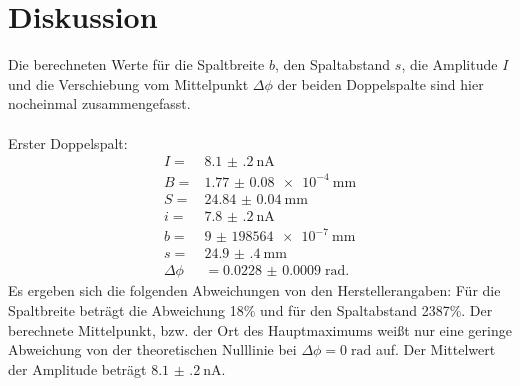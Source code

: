 \section{Diskussion}
\label{sec:Diskussion}
Die berechneten Werte für die Spaltbreite $b$, den Spaltabstand $s$, die Amplitude $I$
und die
Verschiebung vom Mittelpunkt $\Delta \phi$ der beiden
Doppelspalte sind hier nocheinmal zusammengefasst.\\
\\
Erster Doppelspalt:
\begin{align*}
  I =& \SI{8.1(2)}{\nA}\\
  B =& \SI{1.77(8)e-4}{\mm}\\
  S =& \SI{24.84(4)}{\mm}\\
  i =& \SI{7.8(2)}{\nA}\\
  b =& \SI{9(198564)e-7}{\mm}\\
  s =& \SI{24.9(4)}{\mm}\\
  \Delta \phi &=\SI{0.0228(9)}\; \text{rad}.
\end{align*}
Es ergeben sich die folgenden Abweichungen von den Herstellerangaben: Für die
Spaltbreite beträgt die Abweichung 18\% und für den Spaltabstand 2387\%.
Der berechnete Mittelpunkt, bzw. der Ort des Hauptmaximums weißt nur eine
geringe Abweichung von der theoretischen Nulllinie bei $\Delta \phi = 0\; \text{rad}$ auf.
Der Mittelwert der Amplitude beträgt $\SI{8.1(2)}{\nA}$.\\
\\

